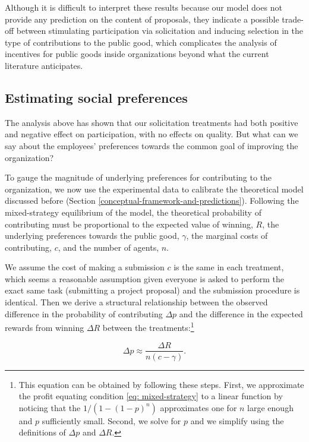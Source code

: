 \documentclass[11pt, titlepage]{article}
\begin{document}
Although it is difficult to interpret these results because our model
does not provide any prediction on the content of proposals, they
indicate a possible trade-off between stimulating participation via
solicitation and inducing selection in the type of contributions to the
public good, which complicates the analysis of incentives for public
goods inside organizations beyond what the current literature
anticipates.

\subsection{Estimating social
preferences}\label{estimating-social-preferences}

The analysis above has shown that our solicitation treatments had both
positive and negative effect on participation, with no effects on
quality. But what can we say about the employees' preferences towards
the common goal of improving the organization?

To gauge the magnitude of underlying preferences for contributing to the
organization, we now use the experimental data to calibrate the
theoretical model discussed before (Section
\ref{conceptual-framework-and-predictions}). Following the
mixed-strategy equilibrium of the model, the theoretical probability of
contributing must be proportional to the expected value of winning,
\(R\), the underlying preferences towards the public good, \(\gamma\),
the marginal costs of contributing, \(c\), and the number of agents,
\(n\).

We assume the cost of making a submission \(c\) is the same in each
treatment, which seems a reasonable assumption given everyone is asked
to perform the exact same task (submitting a project proposal) and the
submission procedure is identical. Then we derive a structural
relationship between the observed difference in the probability of
contributing \(\Delta p\) and the difference in the expected rewards
from winning \(\Delta R\) between the treatments:\footnote{This equation
  can be obtained by following these steps. First, we approximate the
  profit equating condition \eqref{eq: mixed-strategy} to a linear
  function by noticing that the \(1/(1-(1-p)^n)\) approximates one for
  \(n\) large enough and \(p\) sufficiently small. Second, we solve for
  \(p\) and we simplify using the definitions of \(\Delta p\) and
  \(\Delta R\).}

\begin{equation}
  \label{eq: delta}
  \Delta p \approx\frac{\Delta R}{n (c - \gamma)}.
\end{equation}
\end{document}
